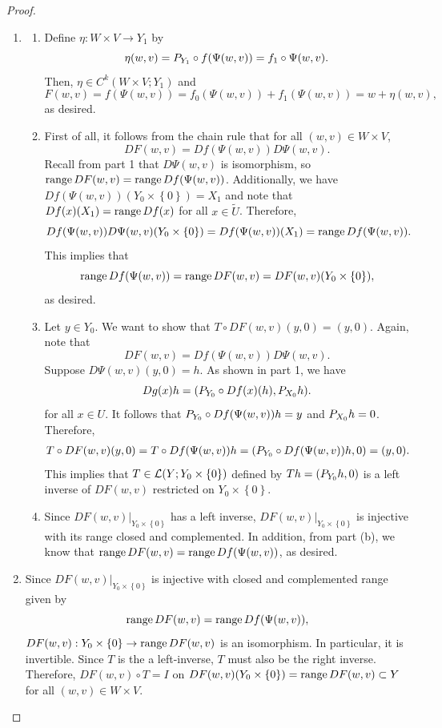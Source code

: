 \documentclass[a4paper]{article}
\begin{document}
\begin{proof}
{\begin{enumerate}
\item \begin{enumerate}
\item Define $\eta: W \times V \to Y_1$ by 
\[
\eta(w, v) = {P_{Y_1}} \circ f(\Psi(w, v)) = f_1 \circ \Psi(w, v).
\]
Then, $\eta \in C^k(W \times V ; Y_1)$ and 
\[
F(w, v) = f (\Psi(w, v)) = f_0 (\Psi (w, v)) 
+ f_1 (\Psi (w, v)) = w + \eta(w, v),
\]
as desired.

\item First of all, it follows from the chain rule that 
for all $(w,v) \in W \times V$,
\[
DF(w, v) = Df(\Psi(w, v)) D\Psi(w, v).
\]
Recall from part 1 that $D\Psi(w, v)$ is isomorphism, 
so $\operatorname{range} DF(w, v) = \operatorname{range} Df(\Psi(w, v))$.
Additionally, we have $Df(\Psi(w, v))(Y_0 \times \left\{ 0 \right\}) = X_1$
and note that $Df(x)(X_1) = \operatorname{range} Df(x)$ for all $x \in \tilde{U}$.
Therefore,
\[
Df(\Psi(w, v)) D\Psi(w, v) (Y_0 \times \left\{ 0 \right\})
= Df(\Psi(w, v))(X_1) = \operatorname{range} Df(\Psi(w, v)).
\]
This implies that 
\[
\operatorname{range} Df(\Psi(w, v)) = \operatorname{range} DF(w, v) = DF(w, v) 
(Y_0 \times \left\{ 0 \right\}),
\]
as desired.

\item Let $y \in Y_0$. We want to show that 
$T \circ DF(w, v) (y, 0) = (y, 0)$. Again, 
note that 
\[
DF(w, v) = Df(\Psi(w, v)) D\Psi(w, v).
\]
Suppose $D \Psi(w, v)(y, 0) = h$. 
As shown in part 1, we have 
\[
Dg(x) h = ({P_{Y_0}} \circ Df(x) (h), {P_{X_0}} h).
\]
for all $x \in U$.
It follows that 
${P_{Y_0}} \circ Df(\Psi(w, v)) h = y$ and ${P_{X_0}} h = 0$. 
Therefore, 
\[
\begin{aligned}
  T \circ DF(w, v) (y, 0) 
  = T \circ Df(\Psi(w, v)) h 
  = ({P_{Y_0}} \circ Df(\Psi(w, v)) h, 0) = (y, 0).
\end{aligned}
\]
This implies that $T \in \mathcal{L}(Y; Y_0 \times \left\{ 0 \right\})$
defined by $Th = ({P_{Y_0}} h, 0)$ is a left inverse of $DF(w, v)$
restricted on $Y_0 \times \left\{ 0 \right\}$.

\item Since $DF(w, v) \vert_{Y_0 \times \left\{ 0 \right\}}$ 
has a left inverse, $DF(w, v) \vert_{Y_0 \times \left\{ 0 \right\}}$
is injective with its range closed and complemented. In addition,
from part (b), we know that $\operatorname{range} DF(w, v) = \operatorname{range} Df(\Psi(w, v))$,
as desired.

\end{enumerate}

\item Since $DF(w, v) \vert_{Y_0 \times \left\{ 0 \right\}}$
is injective with closed and complemented range given by 
\[
\operatorname{range} DF(w, v) = \operatorname{range} Df(\Psi(w, v)),
\]
$DF(w,v) : 
Y_0 \times \left\{ 0 \right\} \to \operatorname{range} DF(w, v)$ 
is an isomorphism.
In particular, it is invertible. Since $T$ is the a left-inverse,
$T$ must also be the right inverse. Therefore, 
$DF(w, v) \circ T = I$ on $DF(w, v)(Y_0 \times \left\{ 0 \right\})
= \operatorname{range} DF(w, v) \subset Y$ for all $(w, v) \in W \times V$.


\end{enumerate}}
\end{proof}
\end{document}
